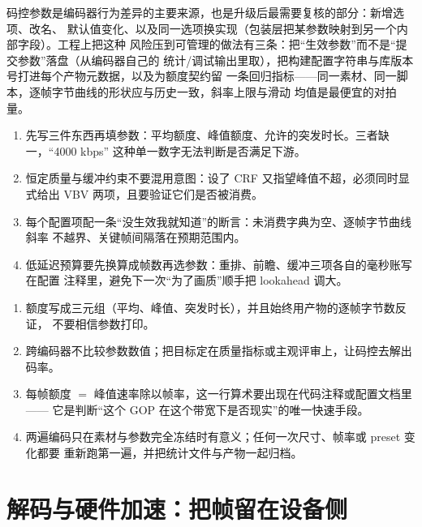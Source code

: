 \documentclass[12pt,a4paper,fontset=fandol]{ctexbook}
\begin{document}
码控参数是编码器行为差异的主要来源，也是升级后最需要复核的部分：新增选项、改名、
默认值变化、以及同一选项换实现（包装层把某参数映射到另一个内部字段）。工程上把这种
风险压到可管理的做法有三条：把``生效参数''而不是``提交参数''落盘（从编码器自己的
统计/调试输出里取），把构建配置字符串与库版本号打进每个产物元数据，以及为额度契约留
一条回归指标——同一素材、同一脚本，逐帧字节曲线的形状应与历史一致，斜率上限与滑动
均值是最便宜的对拍量。

\begin{guideline}[title={把额度当成契约来写，而不是当成一个数}]
\begin{enumerate}
\item 先写三件东西再填参数：平均额度、峰值额度、允许的突发时长。三者缺一，``4000 kbps''
  这种单一数字无法判断是否满足下游。
\item 恒定质量与缓冲约束不要混用意图：设了 CRF 又指望峰值不超，必须同时显式给出
  VBV 两项，且要验证它们是否被消费。
\item 每个配置项配一条``没生效我就知道''的断言：未消费字典为空、逐帧字节曲线斜率
  不越界、关键帧间隔落在预期范围内。
\item 低延迟预算要先换算成帧数再选参数：重排、前瞻、缓冲三项各自的毫秒账写在配置
  注释里，避免下一次``为了画质''顺手把 lookahead 调大。
\end{enumerate}
\end{guideline}

\begin{bestpractice}[title={码控参数面的四条可执行纪律}]
\begin{enumerate}
\item 额度写成三元组（平均、峰值、突发时长），并且始终用产物的逐帧字节数反证，
  不要相信参数打印。
\item 跨编码器不比较参数数值；把目标定在质量指标或主观评审上，让码控去解出码率。
\item 每帧额度 $=$ 峰值速率除以帧率，这一行算术要出现在代码注释或配置文档里——
  它是判断``这个 GOP 在这个带宽下是否现实''的唯一快速手段。
\item 两遍编码只在素材与参数完全冻结时有意义；任何一次尺寸、帧率或 preset 变化都要
  重新跑第一遍，并把统计文件与产物一起归档。
\end{enumerate}
\end{bestpractice}

\chapter{解码与硬件加速：把帧留在设备侧}
\label{ch:ch08-decode-hw}
\end{document}
